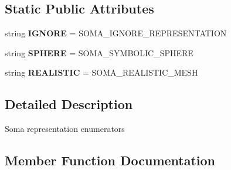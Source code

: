 \subsection*{Static Public Attributes}
\begin{DoxyCompactItemize}
\item 
string {\bfseries I\+G\+N\+O\+RE} = \textquotesingle{}S\+O\+M\+A\+\_\+\+I\+G\+N\+O\+R\+E\+\_\+\+R\+E\+P\+R\+E\+S\+E\+N\+T\+A\+T\+I\+ON\textquotesingle{}\hypertarget{classmeshy_1_1neuromorphovis_1_1enums_1_1soma__enums_1_1Soma_1_1Representation_ac02ab30170d01b6a3f4c51d857d9c5ec}{}\label{classmeshy_1_1neuromorphovis_1_1enums_1_1soma__enums_1_1Soma_1_1Representation_ac02ab30170d01b6a3f4c51d857d9c5ec}

\item 
string {\bfseries S\+P\+H\+E\+RE} = \textquotesingle{}S\+O\+M\+A\+\_\+\+S\+Y\+M\+B\+O\+L\+I\+C\+\_\+\+S\+P\+H\+E\+RE\textquotesingle{}\hypertarget{classmeshy_1_1neuromorphovis_1_1enums_1_1soma__enums_1_1Soma_1_1Representation_a16c30b8f4c62b3fd42dd512ca4cbb4d6}{}\label{classmeshy_1_1neuromorphovis_1_1enums_1_1soma__enums_1_1Soma_1_1Representation_a16c30b8f4c62b3fd42dd512ca4cbb4d6}

\item 
string {\bfseries R\+E\+A\+L\+I\+S\+T\+IC} = \textquotesingle{}S\+O\+M\+A\+\_\+\+R\+E\+A\+L\+I\+S\+T\+I\+C\+\_\+\+M\+E\+SH\textquotesingle{}\hypertarget{classmeshy_1_1neuromorphovis_1_1enums_1_1soma__enums_1_1Soma_1_1Representation_a494c6802acda304a8723255be63ab021}{}\label{classmeshy_1_1neuromorphovis_1_1enums_1_1soma__enums_1_1Soma_1_1Representation_a494c6802acda304a8723255be63ab021}

\end{DoxyCompactItemize}


\subsection{Detailed Description}


\begin{DoxyVerb}Soma representation enumerators
\end{DoxyVerb}
 

\subsection{Member Function Documentation}
